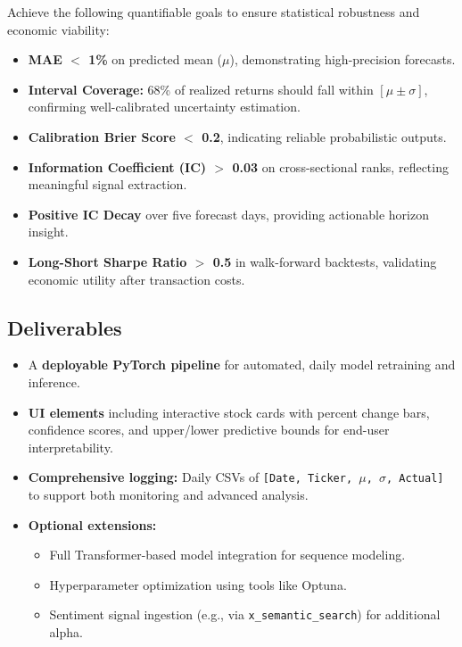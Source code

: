 \documentclass[twoside,final]{hcmut-report}
\begin{document}
Achieve the following quantifiable goals to ensure statistical robustness and economic viability:
\begin{itemize}
  \item \textbf{MAE $<$ 1\%} on predicted mean ($\mu$), demonstrating high-precision forecasts.
  \item \textbf{Interval Coverage:} 68\% of realized returns should fall within $[\mu \pm \sigma]$, confirming well-calibrated uncertainty estimation.
  \item \textbf{Calibration Brier Score $<$ 0.2}, indicating reliable probabilistic outputs.
  \item \textbf{Information Coefficient (IC) $>$ 0.03} on cross-sectional ranks, reflecting meaningful signal extraction.
  \item \textbf{Positive IC Decay} over five forecast days, providing actionable horizon insight.
  \item \textbf{Long-Short Sharpe Ratio $>$ 0.5} in walk-forward backtests, validating economic utility after transaction costs.
\end{itemize}

\subsection{Deliverables}

\begin{itemize}
  \item A \textbf{deployable PyTorch pipeline} for automated, daily model retraining and inference.
  \item \textbf{UI elements} including interactive stock cards with percent change bars, confidence scores, and upper/lower predictive bounds for end-user interpretability.
  \item \textbf{Comprehensive logging:} Daily CSVs of \texttt{[Date, Ticker, $\mu$, $\sigma$, Actual]} to support both monitoring and advanced analysis.
  \item \textbf{Optional extensions:}
        \begin{itemize}
          \item Full Transformer-based model integration for sequence modeling.
          \item Hyperparameter optimization using tools like Optuna.
          \item Sentiment signal ingestion (e.g., via \texttt{x\_semantic\_search}) for additional alpha.
        \end{itemize}
\end{itemize}
\end{document}
